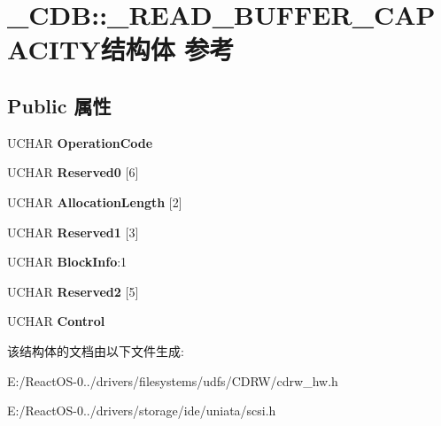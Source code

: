 \hypertarget{struct___c_d_b_1_1___r_e_a_d___b_u_f_f_e_r___c_a_p_a_c_i_t_y}{}\section{\+\_\+\+C\+DB\+:\+:\+\_\+\+R\+E\+A\+D\+\_\+\+B\+U\+F\+F\+E\+R\+\_\+\+C\+A\+P\+A\+C\+I\+T\+Y结构体 参考}
\label{struct___c_d_b_1_1___r_e_a_d___b_u_f_f_e_r___c_a_p_a_c_i_t_y}
\subsection*{Public 属性}
\begin{DoxyCompactItemize}
\item 
\mbox{\label{struct___c_d_b_1_1___r_e_a_d___b_u_f_f_e_r___c_a_p_a_c_i_t_y_a95cb57d158513c1d406dc37b65bfb01c}} 
U\+C\+H\+AR {\bfseries Operation\+Code}
\item 
\mbox{\label{struct___c_d_b_1_1___r_e_a_d___b_u_f_f_e_r___c_a_p_a_c_i_t_y_a3d52ba5ccd2cc35e796fb8244cb3d023}} 
U\+C\+H\+AR {\bfseries Reserved0} \mbox{[}6\mbox{]}
\item 
\mbox{\label{struct___c_d_b_1_1___r_e_a_d___b_u_f_f_e_r___c_a_p_a_c_i_t_y_af07489482ae6113045f568f8f12d3c93}} 
U\+C\+H\+AR {\bfseries Allocation\+Length} \mbox{[}2\mbox{]}
\item 
\mbox{\label{struct___c_d_b_1_1___r_e_a_d___b_u_f_f_e_r___c_a_p_a_c_i_t_y_a8fe86368fd23842fcbb59e0903e86b6b}} 
U\+C\+H\+AR {\bfseries Reserved1} \mbox{[}3\mbox{]}
\item 
\mbox{\label{struct___c_d_b_1_1___r_e_a_d___b_u_f_f_e_r___c_a_p_a_c_i_t_y_a00b4cb356cb2e49b93cf7b3e552e33f7}} 
U\+C\+H\+AR {\bfseries Block\+Info}\+:1
\item 
\mbox{\label{struct___c_d_b_1_1___r_e_a_d___b_u_f_f_e_r___c_a_p_a_c_i_t_y_a55ef162081d01f729b9fe5bb68932e47}} 
U\+C\+H\+AR {\bfseries Reserved2} \mbox{[}5\mbox{]}
\item 
\mbox{\label{struct___c_d_b_1_1___r_e_a_d___b_u_f_f_e_r___c_a_p_a_c_i_t_y_a2153be9631acff4d606729cc8b868ffb}} 
U\+C\+H\+AR {\bfseries Control}
\end{DoxyCompactItemize}


该结构体的文档由以下文件生成\+:\begin{DoxyCompactItemize}
\item 
E\+:/\+React\+O\+S-\/0../drivers/filesystems/udfs/\+C\+D\+R\+W/cdrw\+\_\+hw.\+h\item 
E\+:/\+React\+O\+S-\/0../drivers/storage/ide/uniata/scsi.\+h\end{DoxyCompactItemize}
